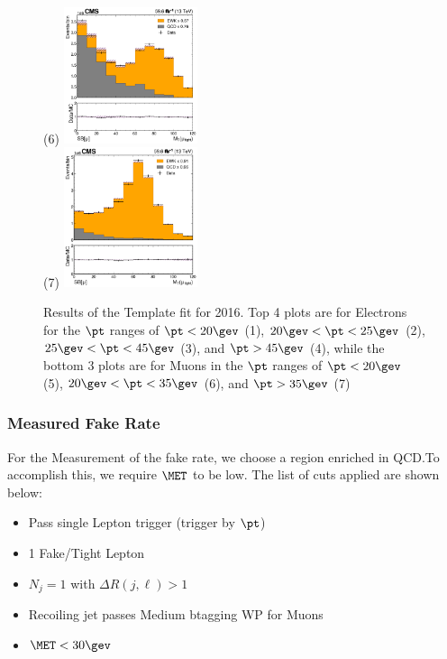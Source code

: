 \begin{figure}
  \subfigure(6) \includegraphics[width=0.35\textwidth]{template_fit/2018/mt_high_Muon_20.0.png} \\
  \subfigure(7) \includegraphics[width=0.35\textwidth]{template_fit/2018/mt_high_Muon_35.0.png}
  \caption{Results of the Template fit for 2016. Top 4 plots are for Electrons for the $\pt$ ranges of $\pt < 20\gev$ (1), $20\gev<\pt<25\gev$ (2), $25\gev<\pt<45\gev$ (3), and $\pt>45\gev$ (4), while the bottom 3 plots are for Muons in the $\pt$ ranges of $\pt < 20\gev$ (5), $20\gev<\pt<35\gev$ (6), and $\pt>35\gev$ (7)}
\end{figure}

\subsubsection{Measured Fake Rate}\label{sec:nonprompt:measurement}

For the Measurement of the fake rate, we choose a region enriched in QCD.\@ To accomplish this, we require $\MET$ to be low. The list of cuts applied are shown below:

\begin{itemize}
  \item Pass single Lepton trigger (trigger by $\pt$)
  \item 1 Fake/Tight Lepton
  \item $N_{j} = 1$ with $\Delta R(j, \ell) > 1$
  \item Recoiling jet passes Medium btagging WP for Muons
  \item $\MET < 30\gev$
\end{itemize}

